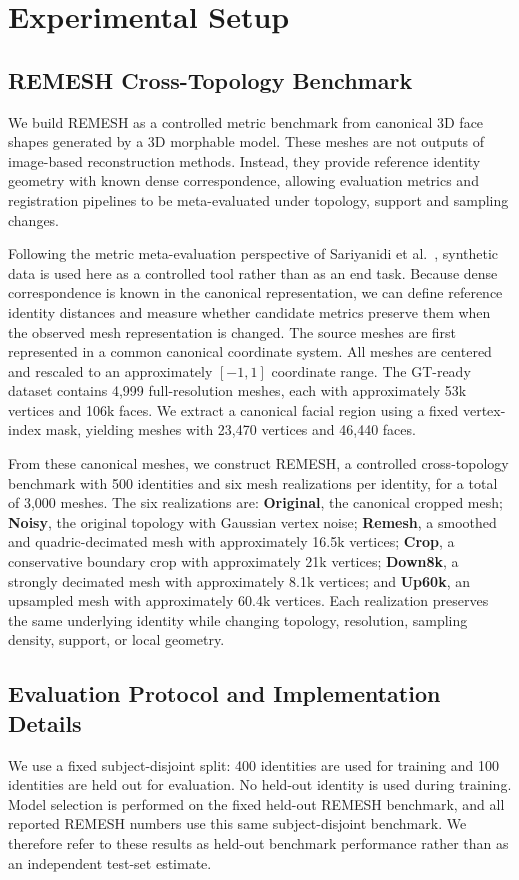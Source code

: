 \documentclass{article}
\begin{document}
\section{Experimental Setup}
\label{sec:experimental_setup}

\subsection{REMESH Cross-Topology Benchmark}
\label{sec:remesh_benchmark}
We build REMESH as a controlled metric benchmark from canonical 3D face shapes generated by a 3D morphable model. These meshes are not outputs of image-based reconstruction methods. Instead, they provide reference identity geometry with known dense correspondence, allowing evaluation metrics and registration pipelines to be meta-evaluated under topology, support and sampling changes.

Following the metric meta-evaluation perspective of
Sariyanidi et al.~\cite{10448898}, synthetic data is used here as a controlled tool rather than as an end task. Because dense correspondence is known in the canonical representation, we can define reference identity distances and measure whether candidate metrics preserve them when the observed mesh representation is changed. The source meshes are first represented in a common canonical coordinate system. All meshes are centered and rescaled to an approximately $[-1,1]$ coordinate range. The GT-ready dataset contains 4,999 full-resolution meshes, each with approximately 53k vertices and 106k faces. We extract a canonical facial region using a fixed vertex-index mask, yielding meshes with 23,470 vertices and 46,440 faces.

From these canonical meshes, we construct REMESH, a controlled cross-topology benchmark with 500 identities and six mesh realizations per identity, for a total of 3,000 meshes. The six realizations are: \textbf{Original}, the canonical cropped mesh;
\textbf{Noisy}, the original topology with Gaussian vertex noise; 
\textbf{Remesh}, a smoothed and quadric-decimated mesh with approximately 16.5k vertices;
\textbf{Crop}, a conservative boundary crop with approximately 21k vertices;
\textbf{Down8k}, a strongly decimated mesh with approximately 8.1k vertices; and
\textbf{Up60k}, an upsampled mesh with approximately 60.4k vertices.
Each realization preserves the same underlying identity while changing topology, resolution, sampling density, support, or local geometry.

\subsection{Evaluation Protocol and Implementation Details}
\label{sec:evaluation_protocol}
We use a fixed subject-disjoint split: 400 identities are used for training and 100 identities are held out for evaluation. No held-out identity is used during training. Model selection is performed on the fixed held-out REMESH benchmark, and all reported REMESH numbers use this same subject-disjoint benchmark. We therefore refer to these results as held-out benchmark performance rather than as an independent test-set estimate.
\end{document}
